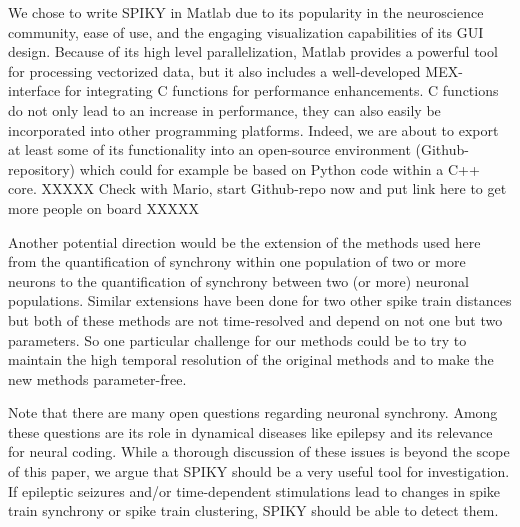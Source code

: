\documentclass[10pt,twocolumn]{elsart5p}
\begin{document}
We chose to write SPIKY in Matlab due to its popularity in the neuroscience community, ease of use, and the engaging visualization capabilities of its GUI design. Because of its high level parallelization, Matlab provides a powerful tool for processing vectorized data, but it also includes a well-developed MEX-interface for integrating C functions for performance enhancements. C functions do not only lead to an increase in performance, they can also easily be incorporated into other programming platforms. Indeed, we are about to export at least some of its functionality into an open-source environment (Github-repository) which could for example be based on Python code within a C++ core. XXXXX Check with Mario, start Github-repo now and put link here to get more people on board XXXXX

Another potential direction would be the extension of the methods used here from the quantification of synchrony within one population of two or more neurons to the quantification of synchrony between two (or more) neuronal populations. Similar extensions have been done for two other spike train distances \citep{Aronov03, Houghton08} but both of these methods are not time-resolved and depend on not one but two parameters. So one particular challenge for our methods could be to try to maintain the high temporal resolution of the original methods and to make the new methods parameter-free.

Note that there are many open questions regarding neuronal synchrony. Among these questions are its role in dynamical diseases like epilepsy and its relevance for neural coding. While a thorough discussion of these issues is beyond the scope of this paper, we argue that SPIKY should be a very useful tool for investigation. If epileptic seizures and/or time-dependent stimulations lead to changes in spike train synchrony or spike train clustering, SPIKY should be able to detect them.

\vspace{1cm}
\end{document}
